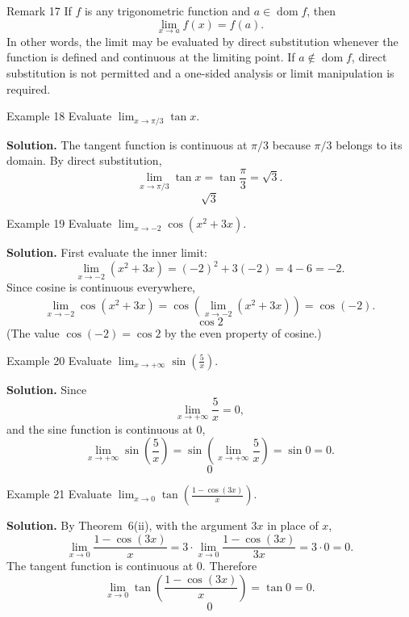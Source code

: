 \begin{remarkbox}{Remark 17}
If \(f\) is any trigonometric function and \(a \in \operatorname{dom} f\), then
\[
\lim_{x \to a} f(x) = f(a).
\]
In other words, the limit may be evaluated by direct substitution whenever the function is defined and continuous at the limiting point. If \(a \notin \operatorname{dom} f\), direct substitution is not permitted and a one-sided analysis or limit manipulation is required.
\end{remarkbox}

\begin{examplebox}{Example 18}
Evaluate \(\displaystyle \lim_{x \to \pi/3} \tan x\).

\medskip
\textbf{Solution.}
The tangent function is continuous at \(\pi/3\) because \(\pi/3\) belongs to its domain. By direct substitution,
\[
\lim_{x \to \pi/3} \tan x = \tan\frac{\pi}{3} = \sqrt{3}.
\]
\[
\boxed{\;\sqrt{3}\;}
\]
\end{examplebox}

\begin{examplebox}{Example 19}
Evaluate \(\displaystyle \lim_{x \to -2} \cos(x^{2} + 3x)\).

\medskip
\textbf{Solution.}
First evaluate the inner limit:
\[
\lim_{x \to -2} (x^{2} + 3x) = (-2)^{2} + 3(-2) = 4 - 6 = -2.
\]
Since cosine is continuous everywhere,
\[
\lim_{x \to -2} \cos(x^{2} + 3x)
= \cos\!\left(\lim_{x \to -2} (x^{2} + 3x)\right)
= \cos(-2).
\]
\[
\boxed{\;\cos 2\;}
\]
(The value \(\cos(-2) = \cos 2\) by the even property of cosine.)
\end{examplebox}

\begin{examplebox}{Example 20}
Evaluate \(\displaystyle \lim_{x \to +\infty} \sin\!\left(\frac{5}{x}\right)\).

\medskip
\textbf{Solution.}
Since
\[
\lim_{x \to +\infty} \frac{5}{x} = 0,
\]
and the sine function is continuous at \(0\),
\[
\lim_{x \to +\infty} \sin\!\left(\frac{5}{x}\right)
= \sin\!\left(\lim_{x \to +\infty} \frac{5}{x}\right)
= \sin 0 = 0.
\]
\[
\boxed{\;0\;}
\]
\end{examplebox}

\begin{examplebox}{Example 21}
Evaluate \(\displaystyle \lim_{x \to 0} \tan\!\left(\frac{1 - \cos(3x)}{x}\right)\).

\medskip
\textbf{Solution.}
By Theorem~6(ii), with the argument \(3x\) in place of \(x\),
\[
\lim_{x \to 0} \frac{1 - \cos(3x)}{x}
= 3 \cdot \lim_{x \to 0} \frac{1 - \cos(3x)}{3x}
= 3 \cdot 0 = 0.
\]
The tangent function is continuous at \(0\). Therefore
\[
\lim_{x \to 0} \tan\!\left(\frac{1 - \cos(3x)}{x}\right)
= \tan 0 = 0.
\]
\[
\boxed{\;0\;}
\]
\end{examplebox}

